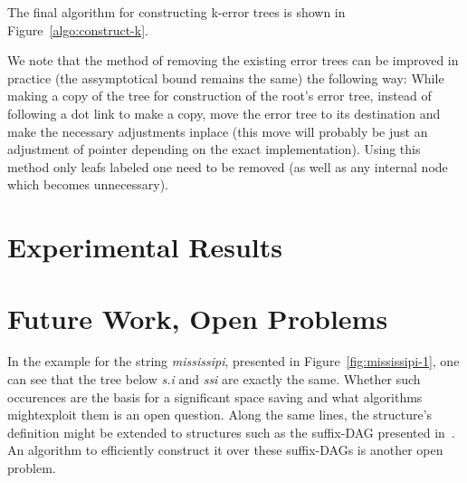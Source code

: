 \documentclass[letter,10pt]{article}
\newcommand{\putstring}[1]{\textsl{#1}}
\begin{document}


The final algorithm for constructing k-error trees is shown in Figure~\ref{algo:construct-k}.

We note that the method of removing the existing error trees can be improved in practice (the assymptotical bound remains the same) the following way: While making a copy of the tree for construction of the root's error tree, instead of following a dot link to make a copy, move the error tree to its destination and make the necessary adjustments inplace (this move will probably be just an adjustment of pointer depending on the exact implementation). Using this method only leafs labeled one need to be removed (as well as any internal node which becomes unnecessary).

\section{Experimental Results}

\section{Future Work, Open Problems}

In the example for the string \putstring{mississipi}, presented in Figure~\ref{fig:mississipi-1}, one can see that the tree below \putstring{s.i} and \putstring{ssi} are exactly the same. Whether such occurences are the basis for a significant space saving and what algorithms mightexploit them is an open question.
Along the same lines, the structure's definition might be extended to structures such as the suffix-DAG presented in~\cite[7.7]{gusfield:algorithms}. An algorithm to efficiently construct it over these suffix-DAGs is another open problem.



\end{document}
